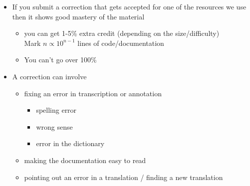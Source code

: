 \documentclass[a4paper,landscape,headrule,footrule,xetex,25pt]{foils}
\begin{document}

\begin{itemize}
\item If you submit a correction that gets accepted for one of the
  resources we use then it shows good mastery of the material
  \begin{itemize}
  \item you can get 1-5\% extra credit (depending on the size/difficulty)
\\ Mark $n \propto 10^{n-1}$ lines of code/documentation
  \item You can't go over 100\%
  \end{itemize}
\item A correction can involve
  \begin{itemize}
  \item fixing an error in transcription or annotation
    \begin{itemize}
    \item spelling error
    \item wrong sense
    \item error in the dictionary
    \end{itemize}
  \item making the documentation easy to read
  \item pointing out an error in a translation / finding a new translation
  \end{itemize}

\end{itemize}



\end{document}
